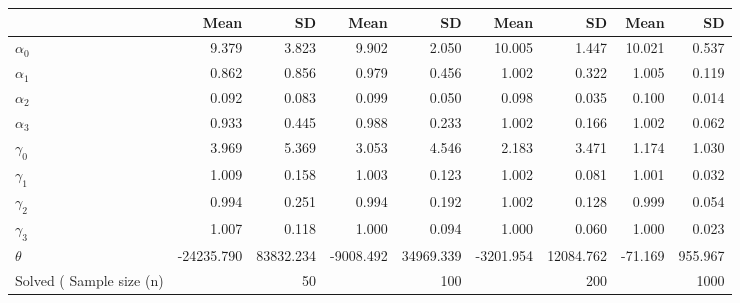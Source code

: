 
\begin{tabular}[t]{lrrrrrrrr}
\toprule
  & Mean & SD & Mean  & SD  & Mean   & SD   & Mean    & SD   \\
\midrule
$\alpha_{0}$ & 9.379 & 3.823 & 9.902 & 2.050 & 10.005 & 1.447 & 10.021 & 0.537\\
$\alpha_{1}$ & 0.862 & 0.856 & 0.979 & 0.456 & 1.002 & 0.322 & 1.005 & 0.119\\
$\alpha_{2}$ & 0.092 & 0.083 & 0.099 & 0.050 & 0.098 & 0.035 & 0.100 & 0.014\\
$\alpha_{3}$ & 0.933 & 0.445 & 0.988 & 0.233 & 1.002 & 0.166 & 1.002 & 0.062\\
$\gamma_{0}$ & 3.969 & 5.369 & 3.053 & 4.546 & 2.183 & 3.471 & 1.174 & 1.030\\
$\gamma_{1}$ & 1.009 & 0.158 & 1.003 & 0.123 & 1.002 & 0.081 & 1.001 & 0.032\\
$\gamma_{2}$ & 0.994 & 0.251 & 0.994 & 0.192 & 1.002 & 0.128 & 0.999 & 0.054\\
$\gamma_{3}$ & 1.007 & 0.118 & 1.000 & 0.094 & 1.000 & 0.060 & 1.000 & 0.023\\
$\theta$ & -24235.790 & 83832.234 & -9008.492 & 34969.339 & -3201.954 & 12084.762 & -71.169 & 955.967\\
Solved (%
Sample size (n) &  & 50 &  & 100 &  & 200 &  & 1000\\
\bottomrule
\end{tabular}
